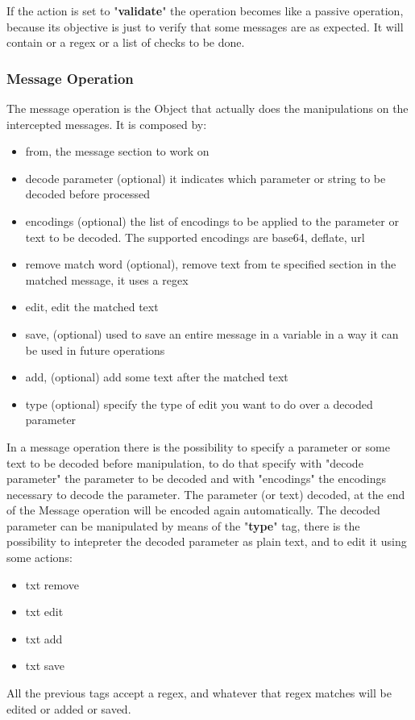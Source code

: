If the action is set to "\textbf{validate}" the operation becomes like a passive operation, because its objective is just to verify that some messages are as expected. It will contain or a regex or a list of checks to be done.

\subsubsection{Message Operation}
The message operation is the Object that actually does the manipulations on the intercepted messages. It is composed by:
\begin{itemize}
    \item from, the message section to work on
    \item decode parameter (optional) it indicates which parameter or string to be decoded before processed
    \item encodings (optional) the list of encodings to be applied to the parameter or text to be decoded. The supported encodings are base64, deflate, url
    \item remove match word (optional), remove text from te specified section in the matched message, it uses a regex
    \item edit, edit the matched text
    \item save, (optional) used to save an entire message in a variable in a way it can be used in future operations
    \item add, (optional) add some text after the matched text
    \item type (optional) specify the type of edit you want to do over a decoded parameter
\end{itemize}

In a message operation there is the possibility to specify a parameter or some text to be decoded before manipulation, to do that specify with "decode parameter" the parameter to be decoded and with "encodings" the encodings necessary to decode the parameter. The parameter (or text) decoded, at the end of the Message operation will be encoded again automatically.
The decoded parameter can be manipulated by means of the "\textbf{type}" tag, there is the possibility to intepreter the decoded parameter as plain text, and to edit it using some actions:
\begin{itemize}
    \item txt remove
    \item txt edit
    \item txt add
    \item txt save
\end{itemize}
All the previous tags accept a regex, and whatever that regex matches will be edited or added or saved.

